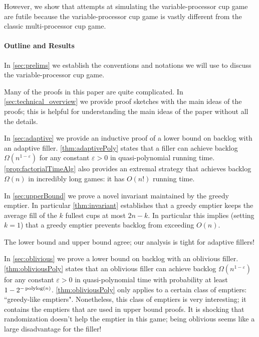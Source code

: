 However, we show that attempts at simulating the variable-processor cup
game are futile because the variable-processor cup game
is vastly different from the classic multi-processor cup game. 

\paragraph{Outline and Results}
In \cref{sec:prelims} we establish the conventions and
notations we will use to discuss the variable-processor cup game. 

Many of the proofs in this paper are quite complicated. In 
\cref{sec:technical_overview} we provide proof sketches with the
main ideas of the proofs; this is helpful for understanding the
main ideas of the paper without all the details.

In \cref{sec:adaptive} we provide an inductive proof of a
lower bound on backlog with an adaptive filler.
\cref{thm:adaptivePoly} states that a filler can achieve backlog
$\Omega(n^{1-\varepsilon})$ for any constant $\varepsilon > 0$ in
quasi-polynomial running time. \cref{prop:factorialTimeAlg} also provides an extremal strategy
that achieves backlog $\Omega(n)$ in incredibly long games: it
has $O(n!)$ running time.

In \cref{sec:upperBound} we prove a novel invariant maintained
by the greedy emptier. In particular \cref{thm:invariant} establishes
that a greedy emptier keeps the average fill of the $k$ fullest cups at most
$2n-k$. In particular this implies (setting $k=1$) that a greedy emptier
prevents backlog from exceeding $O(n)$. 

The lower bound and upper bound agree; our analysis is tight for adaptive fillers!

In \cref{sec:oblivious} we prove a lower bound on backlog with an oblivious filler. 
\cref{thm:obliviousPoly} states that an oblivious filler can achieve
backlog $\Omega(n^{1-\varepsilon})$ for any constant $\varepsilon > 0$ in
quasi-polynomial time with probability at least $1-2^{-\operatorname{\text{polylog}}(n)}$.
\cref{thm:obliviousPoly} only applies to a certain class of emptiers:
``greedy-like emptiers". Nonetheless, this class of emptiers is very
interesting; it contains the emptiers that are used in upper bound proofs.
It is shocking that randomization doesn't help the emptier in this game;
being oblivious seems like a large disadvantage for the filler!

